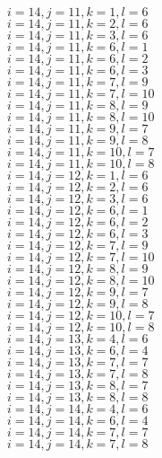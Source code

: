 \documentclass[14pt]{article}
\begin{document}
    $i=14,j=11,k=1,l=6 $ \\ 
    $i=14,j=11,k=2,l=6 $ \\ 
    $i=14,j=11,k=3,l=6 $ \\ 
    $i=14,j=11,k=6,l=1 $ \\ 
    $i=14,j=11,k=6,l=2 $ \\ 
    $i=14,j=11,k=6,l=3 $ \\ 
    $i=14,j=11,k=7,l=9 $ \\ 
    $i=14,j=11,k=7,l=10 $ \\ 
    $i=14,j=11,k=8,l=9 $ \\ 
    $i=14,j=11,k=8,l=10 $ \\ 
    $i=14,j=11,k=9,l=7 $ \\ 
    $i=14,j=11,k=9,l=8 $ \\ 
    $i=14,j=11,k=10,l=7 $ \\ 
    $i=14,j=11,k=10,l=8 $ \\ 
    $i=14,j=12,k=1,l=6 $ \\ 
    $i=14,j=12,k=2,l=6 $ \\ 
    $i=14,j=12,k=3,l=6 $ \\ 
    $i=14,j=12,k=6,l=1 $ \\ 
    $i=14,j=12,k=6,l=2 $ \\ 
    $i=14,j=12,k=6,l=3 $ \\ 
    $i=14,j=12,k=7,l=9 $ \\ 
    $i=14,j=12,k=7,l=10 $ \\ 
    $i=14,j=12,k=8,l=9 $ \\ 
    $i=14,j=12,k=8,l=10 $ \\ 
    $i=14,j=12,k=9,l=7 $ \\ 
    $i=14,j=12,k=9,l=8 $ \\ 
    $i=14,j=12,k=10,l=7 $ \\ 
    $i=14,j=12,k=10,l=8 $ \\ 
    $i=14,j=13,k=4,l=6 $ \\ 
    $i=14,j=13,k=6,l=4 $ \\ 
    $i=14,j=13,k=7,l=7 $ \\ 
    $i=14,j=13,k=7,l=8 $ \\ 
    $i=14,j=13,k=8,l=7 $ \\ 
    $i=14,j=13,k=8,l=8 $ \\ 
    $i=14,j=14,k=4,l=6 $ \\ 
    $i=14,j=14,k=6,l=4 $ \\ 
    $i=14,j=14,k=7,l=7 $ \\ 
    $i=14,j=14,k=7,l=8 $ \\ 
\end{document}
